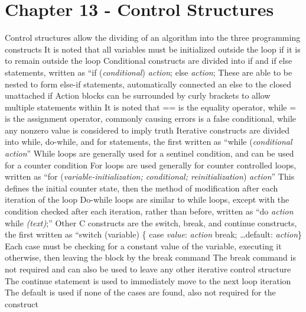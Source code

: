 \documentclass[11 pt, twoside]{article}
\newenvironment{outline*}
{
	\begin{outline}[enumerate]
	}
	{\end{outline}
}
\begin{document}
\section{Chapter 13 - Control Structures}
\begin{outline*}
\1 Control structures allow the dividing of an algorithm into the three programming constructs
\2 It is noted that all variables must be initialized outside the loop if it is to remain outside the loop
\1 Conditional constructs are divided into if and if else statements, written as ``if (\textit{conditional}) \textit{action}; else \textit{action};
\2 These are able to be nested to form else-if statements, automatically connected an else to the closed unattached if
\2 Action blocks can be surrounded by curly brackets to allow multiple statements within
\2 It is noted that == is the equality operator, while = is the assignment operator, commonly causing errors
 is a false conditional, while any nonzero value is considered to imply truth
\1 Iterative constructs are divided into while, do-while, and for statements, the first written as ``while (\textit{conditional} \textit{action}''
\2 While loops are generally used for a sentinel condition, and can be used for a counter condition
\2 For loops are used generally for counter controlled loops, written as ``for (\textit{variable-initialization; conditional; reinitialization}) \textit{action}''
\3 This defines the initial counter state, then the method of modification after each iteration of the loop
\2 Do-while loops are similar to while loops, except with the condition checked after each iteration, rather than before, written as ``do \textit{action} while \textit{(text)};''
\1 Other C constructs are the switch, break, and continue constructs, the first written as ``switch (variable) \{ case \textit{value}: \textit{action} break; \dots default: \textit{action}\}
\2 Each case must be checking for a constant value of the variable, executing it otherwise, then leaving the block by the break command
\2 The break command is not required and can also be used to leave any other iterative control structure
\3 The continue statement is used to immediately move to the next loop iteration
\2 The default is used if none of the cases are found, also not required for the construct
\end{outline*}
\end{document}

